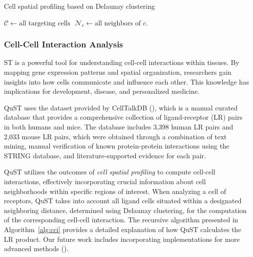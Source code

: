 \documentclass{article}
\begin{document}
\begin{algorithm}[tbp]
	\caption{Cell spatial profiling based on Delaunay clustering}\label{alg:csp}
	\begin{algorithmic}[1]
	\State $\mathcal{C} \gets \text{all targeting cells }$
	\State $\mathcal{N}_{c} \gets \text{all neighbors of }c.$
	\EndIf
	\EndFor
	\Statex
	\Repeat
			\EndIf
		\EndFor
	\EndProcedure		
\end{algorithmic}
\end{algorithm}

\subsubsection{Cell-Cell Interaction Analysis}
\label{sec:cci}

ST is a powerful tool for understanding cell-cell interactions within tissues. By mapping gene expression patterns and spatial organization, researchers gain insights into how cells communicate and influence each other. This knowledge has implications for development, disease, and personalized medicine.

QuST uses the dataset provided by CellTalkDB (\cite{Shao:2021}), which is a manual curated database that provides a comprehensive collection of ligand-receptor (LR) pairs in both humans and mice. The database includes 3,398 human LR pairs and 2,033 mouse LR pairs, which were obtained through a combination of text mining, manual verification of known protein-protein interactions using the STRING database, and literature-supported evidence for each pair.

QuST utilizes the outcomes of \emph{cell spatial profiling} to compute cell-cell interactions, effectively incorporating crucial information about cell neighborhoods within specific regions of interest. When analyzing a cell of receptors, QuST takes into account all ligand cells situated within a designated neighboring distance, determined using Delaunay clustering, for the computation of the corresponding cell-cell interaction. The recursive algorithm presented in Algorithm~\ref{alg:cci} provides a detailed explanation of how QuST calculates the LR product. Our future work includes incorporating implementations for more advanced methods (\cite{Shao:2021}).
\end{document}

